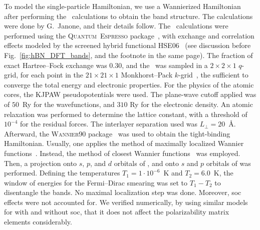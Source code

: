 To model the single-particle Hamiltonian, we use a Wannierized Hamiltonian after performing the \dft~calculations to obtain the band structure.
The calculations were done by G.~Janone, and their details follow.
The \dft~calculations were performed using the \textsc{Quantum~Espresso} package~\cite{giannozzi2009quantum}, with exchange and correlation effects modeled by the screened hybrid functional HSE06~\cite{Heyd_Scuseria_Ernzerhof_2003} (see discussion before Fig.~\ref{fig:hBN_DFT_bands}, and the footnote in the same page).
The fraction of exact Hartree--Fock exchange was 0.30, and the \bz~was sampled in a $2\times2\times1$ $q$-grid, for each point in the $21\times21\times1$ Monkhorst--Pack $k$-grid~\cite{Monkhorst_Pack_1976}, the sufficient to converge the total energy and electronic properties.
For the physics of the atomic cores, the KJPAW pseudopotentials were used.
The plane-wave cutoff applied was of $50$~Ry for the wavefunctions, and $310$ Ry for the electronic density.
An atomic relaxation was performed to determine the lattice constant, with a threshold of $10^{-4}$ for the residual forces.
The interlayer separation used was $L_{\perp} = 20$~\unit{\angstrom}.
Afterward, the \textsc{Wannier90} package~\cite{Wannier90} was used to obtain the tight-binding Hamiltonian.
Usually, one applies the method of maximally localized Wannier functions~\cite{Marzari_2012}.
Instead, the method of closest Wannier functions~\cite{ozaki2024closest,oiwa_symmetry-adapted_2025} was employed.
Then, a projection onto $s$, $p$, and $d$ orbitals of , and onto $s$ and $p$ orbitals of  was performed.
Defining the temperatures $T_1 = 1\cdot10^{-6}$~\unit{\kelvin} and $T_2=6.0$~\unit{\kelvin}, the window of energies for the Fermi--Dirac smearing was set to $T_1-T_2$ to disentangle the bands.
No maximal localization step was done.
Moreover, \gls{soc} effects were not accounted for.
We verified numerically, by using similar models for  with and without \gls{soc}, that it does not affect the polarizability matrix elements considerably.

